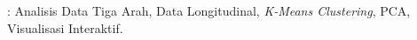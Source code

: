 \begin{singlespace}
\bigskip

\noindent

\vspace*{0.5cm}

\noindent {}:
	Analisis Data Tiga Arah, Data Longitudinal, \textit{K-Means Clustering}, PCA, Visualisasi Interaktif.
\end{singlespace}
\newpage 
